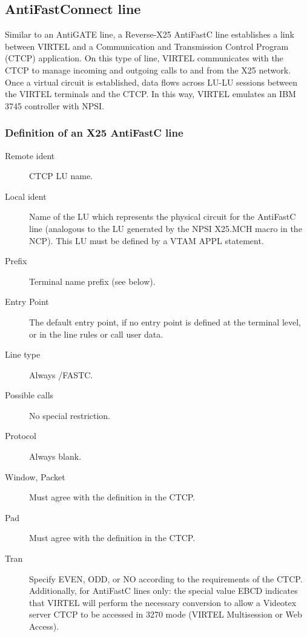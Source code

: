 \documentclass[letterpaper,10pt,english]{sphinxmanual}
\begin{document}
\subsection{AntiFastConnect line}
\label{\detokenize{connectivity_guide:antifastconnect-line}}
Similar to an AntiGATE line, a Reverse-X25 AntiFastC line establishes a link between VIRTEL and a Communication and Transmission Control Program (CTCP) application. On this type of   line, VIRTEL communicates with the CTCP to manage incoming and outgoing calls to and from the X25 network. Once a virtual circuit is established, data flows across LU-LU sessions between the VIRTEL terminals and the CTCP. In this way, VIRTEL emulates an IBM 3745 controller with NPSI.



\subsubsection{Definition of an X25 AntiFastC line}
\label{\detokenize{connectivity_guide:definition-of-an-x25-antifastc-line}}\begin{description}
\item[{Remote ident}] \leavevmode
CTCP LU name.

\item[{Local ident}] \leavevmode
Name of the LU which represents the physical circuit for the AntiFastC line (analogous to the LU generated by the NPSI X25.MCH macro in the NCP). This LU must be defined by a VTAM APPL statement.

\item[{Prefix}] \leavevmode
Terminal name prefix (see below).

\item[{Entry Point}] \leavevmode
The default entry point, if no entry point is defined at the terminal level, or in the line rules or call user data.

\item[{Line type}] \leavevmode
Always /FASTC.

\item[{Possible calls}] \leavevmode
No special restriction.

\item[{Protocol}] \leavevmode
Always blank.

\item[{Window, Packet}] \leavevmode
Must agree with the definition in the CTCP.

\item[{Pad}] \leavevmode
Must agree with the definition in the CTCP.

\item[{Tran}] \leavevmode
Specify EVEN, ODD, or NO according to the requirements of the CTCP. Additionally, for AntiFastC lines only: the special value EBCD indicates that VIRTEL will perform the necessary conversion to allow a Videotex server CTCP to be accessed in 3270 mode (VIRTEL Multisession or Web Access).

\end{description}
\end{document}
